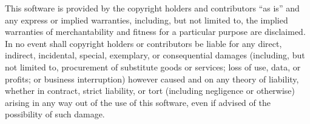 This software is provided by the copyright holders and contributors “as is” and any express or implied warranties, including, but not limited to, the implied warranties of merchantability and fitness for a particular purpose are disclaimed. In no event shall copyright holders or contributors be liable for any direct, indirect, incidental, special, exemplary, or consequential damages (including, but not limited to, procurement of substitute goods or services; loss of use, data, or profits; or business interruption) however caused and on any theory of liability, whether in contract, strict liability, or tort (including negligence or otherwise) arising in any way out of the use of this software, even if advised of the possibility of such damage.